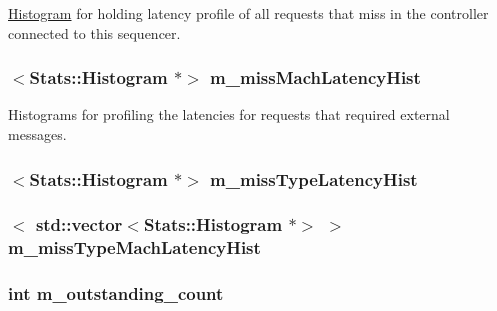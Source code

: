 \label{classSequencer_aff6841cbe8b6a9be485b4c45a8208f93}
\hyperlink{classHistogram}{Histogram} for holding latency profile of all requests that miss in the controller connected to this sequencer. \hypertarget{classSequencer_a55e994bce4da18f7600be6cbf7a4a3b5}{
\subsubsection[{m\_\-missMachLatencyHist}]{$<${\bf Stats::Histogram} $\ast$$>$ {\bf m\_\-missMachLatencyHist}}}
\label{classSequencer_a55e994bce4da18f7600be6cbf7a4a3b5}
Histograms for profiling the latencies for requests that required external messages. \hypertarget{classSequencer_ac5a934c0abe9f0185357eb76de27dee3}{
\subsubsection[{m\_\-missTypeLatencyHist}]{$<${\bf Stats::Histogram} $\ast$$>$ {\bf m\_\-missTypeLatencyHist}}}
\label{classSequencer_ac5a934c0abe9f0185357eb76de27dee3}
\hypertarget{classSequencer_a8e022aebc37a4b83df56956874befd75}{
\subsubsection[{m\_\-missTypeMachLatencyHist}]{$<$ {\bf std::vector}$<${\bf Stats::Histogram} $\ast$$>$ $>$ {\bf m\_\-missTypeMachLatencyHist}}}
\label{classSequencer_a8e022aebc37a4b83df56956874befd75}
\hypertarget{classSequencer_a5d645b1dc48106eac07688fc8c65edd2}{
\subsubsection[{m\_\-outstanding\_\-count}]{\setlength{\rightskip}{0pt plus 5cm}int {\bf m\_\-outstanding\_\-count}}}
